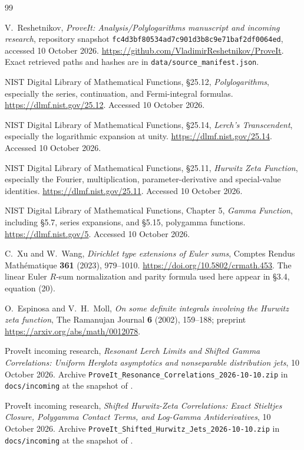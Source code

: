 \begin{thebibliography}{99}

V.~Reshetnikov, \emph{ProveIt: Analysis/Polylogarithms manuscript and
incoming research}, repository snapshot
\texttt{fc4d3bf80534ad7c901d3b8c9e71baf2df0064ed}, accessed 10 October 2026.
\url{https://github.com/VladimirReshetnikov/ProveIt}.
Exact retrieved paths and hashes are in \texttt{data/source\_manifest.json}.

NIST Digital Library of Mathematical Functions,
\S25.12, \emph{Polylogarithms}, especially the series, continuation,
and Fermi-integral formulas. \url{https://dlmf.nist.gov/25.12}.
Accessed 10 October 2026.

NIST Digital Library of Mathematical Functions,
\S25.14, \emph{Lerch's Transcendent}, especially the logarithmic
expansion at unity. \url{https://dlmf.nist.gov/25.14}.
Accessed 10 October 2026.

NIST Digital Library of Mathematical Functions,
\S25.11, \emph{Hurwitz Zeta Function}, especially the Fourier,
multiplication, parameter-derivative and special-value identities.
\url{https://dlmf.nist.gov/25.11}. Accessed 10 October 2026.

NIST Digital Library of Mathematical Functions,
Chapter 5, \emph{Gamma Function}, including \S5.7, series expansions,
and \S5.15, polygamma functions.
\url{https://dlmf.nist.gov/5}. Accessed 10 October 2026.

C.~Xu and W.~Wang, \emph{Dirichlet type extensions of Euler sums},
Comptes Rendus Math\'ematique \textbf{361} (2023), 979--1010.
\url{https://doi.org/10.5802/crmath.453}.
The linear Euler $R$-sum normalization and parity formula used here
appear in \S3.4, equation (20).

O.~Espinosa and V.~H.~Moll,
\emph{On some definite integrals involving the Hurwitz zeta function},
The Ramanujan Journal \textbf{6} (2002), 159--188;
preprint \url{https://arxiv.org/abs/math/0012078}.

ProveIt incoming research,
\emph{Resonant Lerch Limits and Shifted Gamma Correlations:
Uniform Herglotz asymptotics and nonseparable distribution jets},
10 October 2026.
Archive \texttt{ProveIt\_Resonance\_Correlations\_2026-10-10.zip}
in \texttt{docs/incoming} at the snapshot of \cite{ProveIt}.

ProveIt incoming research,
\emph{Shifted Hurwitz-Zeta Correlations: Exact Stieltjes Closure,
Polygamma Contact Terms, and Log-Gamma Antiderivatives},
10 October 2026.
Archive \texttt{ProveIt\_Shifted\_Hurwitz\_Jets\_2026-10-10.zip}
in \texttt{docs/incoming} at the snapshot of \cite{ProveIt}.


\end{thebibliography}
